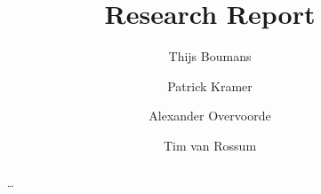 \documentclass{report}
\title{Research Report}
\author{Thijs Boumans \and Patrick Kramer \and 
        Alexander Overvoorde \and Tim van Rossum}
\begin{document}
\maketitle

\begin{abstract}
\dots
\end{abstract}

\tableofcontents




\end{document}
